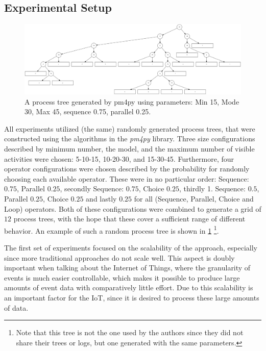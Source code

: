 \documentclass[runningheads]{template/llncs}
\begin{document}
\subsection{Experimental Setup}
\begin{figure}
	\includegraphics[width=1\textwidth]{figures/process-tree}
	\caption{A process tree generated by pm4py using parameters: Min 15, Mode 30, Max 45, sequence 0.75, parallel 0.25. }
	\label{fig:process-tree}
\end{figure}

All experiments utilized (the same) randomly generated process trees, that were constructed using the algorithms in the \emph{pm4py} library.
Three size configurations described by minimum number, the model, and the maximum number of visible activities were chosen: 5-10-15, 10-20-30, and 15-30-45.
Furthermore, four operator configurations were chosen described by the probability for randomly choosing each available operator.
These were in no particular order: Sequence: $0.75$, Parallel $0.25$, secondly Sequence: $0.75$, Choice $0.25$, thirdly 1. Sequence: $0.5$, Parallel $0.25$, Choice $0.25$ and lastly $0.25$ for all (Sequence, Parallel, Choice and Loop) operators.
Both of these configurations were combined to generate a grid of $12$ process trees, with the hope that these cover a sufficient range of different behavior.
An example of such a random process tree is shown in \cref{fig:process-tree}
\footnote{Note that this tree is not the one used by the authors since they did not share their trees or logs, but one generated with the same parameters.}.


The first set of experiments focused on the scalability of the approach, especially since more traditional approaches do not scale well. This aspect is doubly important when talking about the Internet of Things, where the granularity of events is much easier controllable, which makes it possible to produce large amounts of event data with comparatively little effort.
Due to this scalability is an important factor for the IoT, since it is desired to process these large amounts of data.
\end{document}
